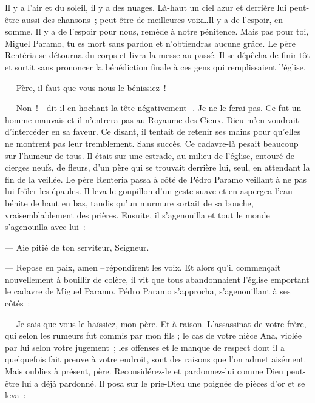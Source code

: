   \og{}Il y a l'air et du soleil, il y a des nuages. Là-haut un ciel azur et derrière lui peut-être aussi des chansons ; peut-être de meilleures voix\ldots Il y a de l'espoir, en somme. Il y a de l'espoir pour nous, remède à notre pénitence.
\pend
%
\pstart
  \guillemotright Mais pas pour toi, Miguel Paramo, tu es mort sans pardon et n'obtiendras aucune grâce.\fg{}
\pend
%
\pstart
  Le père Rentéria se détourna du corps et livra la messe au passé. Il se dépêcha de finir tôt et sortit sans prononcer la bénédiction finale à ces gens qui remplissaient l'église.

  --- Père, il faut que vous nous le bénissiez !

  --- Non ! --\,dit-il en hochant la tête négativement\,--. Je ne le ferai pas. Ce fut un homme mauvais et il n'entrera pas au Royaume des Cieux. Dieu m'en voudrait d'intercéder en sa faveur.
\pend
%
\pstart
  Ce disant, il tentait de retenir ses mains pour qu'elles ne montrent pas leur tremblement. Sans succès.
\pend
%
\pstart
  Ce cadavre-là pesait beaucoup sur l'humeur de tous. Il était sur une estrade, au milieu de l'église, entouré de cierges neufs, de fleurs, d'un père qui se trouvait derrière lui, seul, en attendant la fin de la veillée.
\pend
%
\pstart
  Le père Renteria passa à côté de Pédro Paramo veillant à ne pas lui frôler les épaules. Il leva le goupillon d'un geste suave et en aspergea l'eau bénite de haut en bas, tandis qu'un murmure sortait de sa bouche, vraisemblablement des prières. Ensuite, il s'agenouilla et tout le monde s'agenouilla avec lui :

  --- Aie pitié de ton serviteur, Seigneur.

  --- Repose en paix, amen --\,répondirent les voix.
\pend
%
\pstart
  Et alors qu'il commençait nouvellement à bouillir de colère, il vit que tous abandonnaient l'église emportant le cadavre de Miguel Paramo.
\pend
%
\pstart
  Pédro Paramo s'approcha, s'agenouillant à ses côtés :

  --- Je sais que vous le haïssiez, mon père. Et à raison. L'assassinat de votre frère, qui selon les rumeurs fut commis par mon fils ; le cas de votre nièce Ana, violée par lui selon votre jugement ; les offenses et le manque de respect dont il a quelquefois fait preuve à votre endroit, sont des raisons que l'on admet aisément. Mais oubliez à présent, père. Reconsidérez-le et pardonnez-lui comme Dieu peut-être lui a déjà pardonné.
\pend
%
\pstart
  Il posa sur le prie-Dieu une poignée de pièces d'or et se leva :

